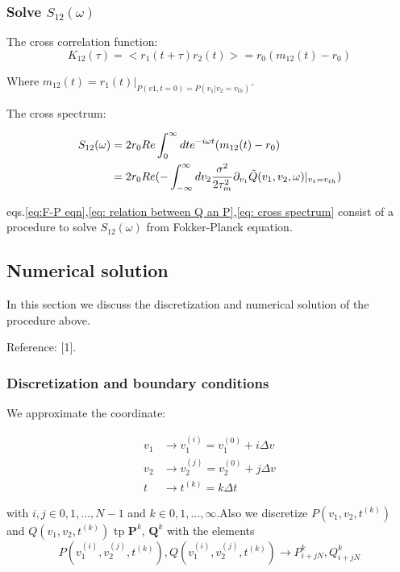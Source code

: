 \documentclass{article}
\begin{document}
	
	\subsubsection{Solve $S_{12}(\omega)$}
	The cross correlation function:
	\begin{equation}
		K_{12}(\tau)=<r_1(t+\tau)r_2(t)>=r_0(m_{12}(t)-r_0)
	\end{equation}	
	
	Where $m_{12}(t)=r_1(t)|_{P(v1,t=0)=P(v_1|v_2=v_{th})}$.
	
	The cross spectrum:
	
	\begin{align}
	    S_{12}(\omega)&=2r_0Re\int_0^{\infty}dte^{-i\omega t}(m_{12}(t)-r_0)\notag\\
	    &=2r_0Re(-\int_{-\infty}^{\infty}dv_2\frac{\sigma^2}{2\tau_m^2}\partial_{v_1}\tilde{Q}(v_1,v_2,\omega)|_{v_1=v_{th}})
	    \label{eq: cross spectrum}
	\end{align}
	
	eqs.\eqref{eq:F-P eqn},\eqref{eq: relation between Q an P},\eqref{eq: cross spectrum} consist of a procedure to solve $S_{12}(\omega)$ from Fokker-Planck equation.
	
	\subsection{Numerical solution}
	
	In this section we discuss the discretization and numerical solution of the procedure above.
	
	Reference: [1].
	
	\subsubsection{Discretization and boundary conditions}
	
	We approximate the coordinate:
	
	\begin{align}
		v_1&\rightarrow v_1^{(i)}=v_1^{(0)}+i\Delta v\\
		v_2&\rightarrow v_2^{(j)}=v_2^{(0)}+j\Delta v\\
		t&\rightarrow t^{(k)}=k\Delta t
	\end{align}
	
	with $i,j \in {0,1,...,N-1}$ and $k \in {0,1,...,\infty}$.Also we discretize $P(v_1,v_2,t^{(k)})$ and $Q(v_1,v_2,t^{(k)})$ tp $\textbf{P}^k$, $\textbf{Q}^k$ with the elements
	\begin{equation}
		P(v_1^{(i)},v_2^{(j)},t^{(k)}),Q(v_1^{(i)},v_2^{(j)},t^{(k)})\rightarrow P_{i+jN}^k,Q_{i+jN}^k
	\end{equation}
	
\end{document}
